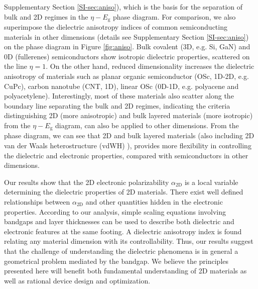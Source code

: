 \documentclass[journal=ancac3,manuscript=article,email=true,hyperref=true,keywords=false]{achemso}
\begin{document}
Supplementary Section \ref{SI-sec:aniso}), which is the basis for the
separation of bulk and 2D regimes in the $\eta-E_{\mathrm{g}}$ phase
diagram.  For comparison, we also superimpose the dielectric
anisotropy indices of common semiconducting materials in other
dimensions (details see Supplementary Section \ref{SI-sec:aniso}) on
the phase diagram in Figure \ref{fig:aniso}. Bulk covalent (3D,
e.g. Si, GaN) and 0D (fullerenes) semiconductors show isotropic
dielectric properties, scattered on the line $\eta=1$. On the other
hand, reduced dimensionality increases the dielectric anisotropy of
materials such as planar organic semiconductor (OSc, 1D-2D,
e.g. CuPc), carbon nanotube (CNT, 1D), linear OSc (0D-1D,
e.g. polyacene and polyacetylene). Interestingly, most of these
materials also scatter along the boundary line separating the bulk and
2D regimes, indicating the criteria distinguishing 2D (more
anisotropic) and bulk layered materials (more isotropic) from the
$\eta-E_{\mathrm{g}}$ diagram, can also be applied to other
dimensions. From the phase diagram, we can see that 2D and bulk
layered materials (also including 2D van der Waals heterostructure
(vdWH) \cite{Novoselov_2016}), provides more flexibility in
controlling the dielectric and electronic properties, compared with
semiconductors in other dimensions.

%



Our results show that the 2D electronic polarizability
$\alpha_{\mathrm{2D}}$ is a local variable determining the dielectric
properties of 2D materials.  There exist well defined relationships
between $\alpha_{\mathrm{2D}}$ and other quantities hidden in the
electronic properties.  According to our analysis, simple scaling
equations involving bandgaps and layer thicknesses can be used to
describe both dielectric and electronic features at the same
footing. A dielectric anisotropy index is found relating any material
dimension with its controllability.  Thus, our results suggest that
the challenge of understanding the dielectric phenomena is in general
a geometrical problem mediated by the bandgap. We believe the
principles presented here will benefit both fundamental understanding
of 2D materials as well as rational device design and optimization.
\end{document}
